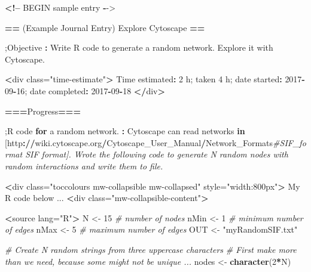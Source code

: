 \documentclass[]{book}
\newenvironment{Shaded}{\begin{snugshade}}{\end{snugshade}}
\newcommand{\KeywordTok}[1]{\textcolor[rgb]{0.13,0.29,0.53}{\textbf{#1}}}
\newcommand{\DecValTok}[1]{\textcolor[rgb]{0.00,0.00,0.81}{#1}}
\newcommand{\StringTok}[1]{\textcolor[rgb]{0.31,0.60,0.02}{#1}}
\newcommand{\CommentTok}[1]{\textcolor[rgb]{0.56,0.35,0.01}{\textit{#1}}}
\newcommand{\ControlFlowTok}[1]{\textcolor[rgb]{0.13,0.29,0.53}{\textbf{#1}}}
\newcommand{\OperatorTok}[1]{\textcolor[rgb]{0.81,0.36,0.00}{\textbf{#1}}}
\newcommand{\ErrorTok}[1]{\textcolor[rgb]{0.64,0.00,0.00}{\textbf{#1}}}
\newcommand{\NormalTok}[1]{#1}
\begin{document}
\begin{Shaded}
\begin{Highlighting}[]
\ErrorTok{<}\OperatorTok{!--}\StringTok{ }\NormalTok{BEGIN sample entry }\OperatorTok{-}\NormalTok{->}

\ErrorTok{==}\StringTok{ }\NormalTok{(Example Journal Entry) Explore Cytoscape }\OperatorTok{==}

\NormalTok{;Objective}
\OperatorTok{:}\StringTok{ }\NormalTok{Write R code to generate a random network. Explore it with Cytoscape.}

\OperatorTok{<}\NormalTok{div class=}\StringTok{"time-estimate"}\OperatorTok{>}
\NormalTok{Time estimated}\OperatorTok{:}\StringTok{ }\DecValTok{2}\NormalTok{ h; taken }\DecValTok{4}\NormalTok{ h; date started}\OperatorTok{:}\StringTok{ }\DecValTok{2017}\OperatorTok{-}\DecValTok{09}\OperatorTok{-}\DecValTok{16}\NormalTok{; date completed}\OperatorTok{:}\StringTok{ }\DecValTok{2017}\OperatorTok{-}\DecValTok{09}\OperatorTok{-}\DecValTok{18}
\OperatorTok{<}\ErrorTok{/}\NormalTok{div}\OperatorTok{>}

\ErrorTok{===}\NormalTok{Progress}\OperatorTok{==}\ErrorTok{=}

\NormalTok{;R code }\ControlFlowTok{for}\NormalTok{ a random network.}
\OperatorTok{:}\StringTok{ }\NormalTok{Cytoscape can read networks }\ControlFlowTok{in}\NormalTok{ [http}\OperatorTok{:}\ErrorTok{//}\NormalTok{wiki.cytoscape.org}\OperatorTok{/}\NormalTok{Cytoscape_User_Manual}\OperatorTok{/}\NormalTok{Network_Formats}\CommentTok{#SIF_format SIF format]. Wrote the following code to generate N random nodes with random interactions and write them to file.}

\OperatorTok{<}\NormalTok{div class=}\StringTok{"toccolours mw-collapsible mw-collapsed"}\NormalTok{ style=}\StringTok{"width:800px"}\OperatorTok{>}
\NormalTok{My R code below ...}
\OperatorTok{<}\NormalTok{div class=}\StringTok{"mw-collapsible-content"}\OperatorTok{>}

\ErrorTok{<}\NormalTok{source lang=}\StringTok{"R"}\OperatorTok{>}
\NormalTok{N <-}\StringTok{ }\DecValTok{15}  \CommentTok{# number of nodes}
\NormalTok{nMin <-}\StringTok{ }\DecValTok{1} \CommentTok{# minimum number of edges}
\NormalTok{nMax <-}\StringTok{ }\DecValTok{5} \CommentTok{# maximum number of edges}
\NormalTok{OUT <-}\StringTok{ "myRandomSIF.txt"}


\CommentTok{# Create N random strings from three uppercase characters}
\CommentTok{# First make more than we need, because some might not be unique ...}
\NormalTok{nodes <-}\StringTok{ }\KeywordTok{character}\NormalTok{(}\DecValTok{2}\OperatorTok{*}\NormalTok{N)}


\end{Highlighting}
\end{Shaded}
\end{document}

